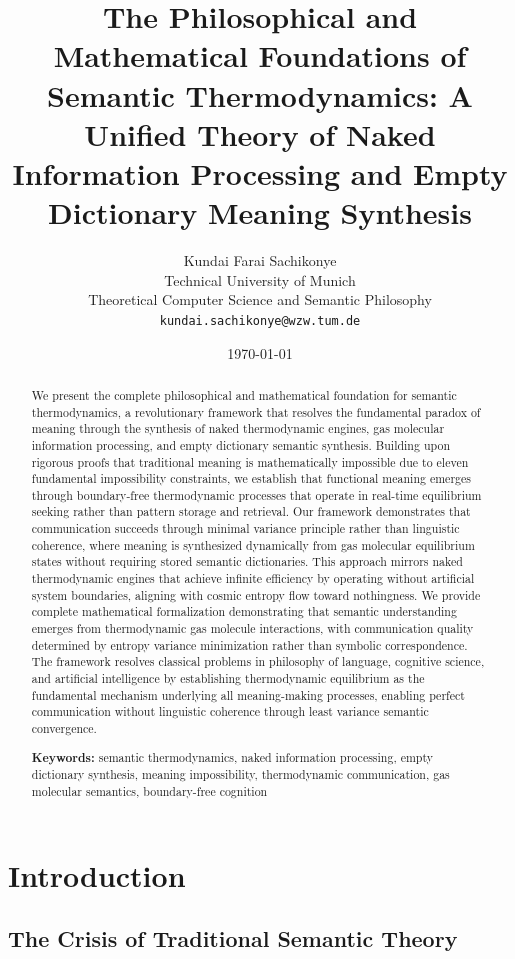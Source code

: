 \documentclass[11pt,a4paper]{article}
\title{The Philosophical and Mathematical Foundations of Semantic Thermodynamics: A Unified Theory of Naked Information Processing and Empty Dictionary Meaning Synthesis}
\author{Kundai Farai Sachikonye\\
Technical University of Munich\\
Theoretical Computer Science and Semantic Philosophy\\
\texttt{kundai.sachikonye@wzw.tum.de}}
\date{\today}
\begin{document}
\maketitle

\begin{abstract}
We present the complete philosophical and mathematical foundation for semantic thermodynamics, a revolutionary framework that resolves the fundamental paradox of meaning through the synthesis of naked thermodynamic engines, gas molecular information processing, and empty dictionary semantic synthesis. Building upon rigorous proofs that traditional meaning is mathematically impossible due to eleven fundamental impossibility constraints, we establish that functional meaning emerges through boundary-free thermodynamic processes that operate in real-time equilibrium seeking rather than pattern storage and retrieval. Our framework demonstrates that communication succeeds through minimal variance principle rather than linguistic coherence, where meaning is synthesized dynamically from gas molecular equilibrium states without requiring stored semantic dictionaries. This approach mirrors naked thermodynamic engines that achieve infinite efficiency by operating without artificial system boundaries, aligning with cosmic entropy flow toward nothingness. We provide complete mathematical formalization demonstrating that semantic understanding emerges from thermodynamic gas molecule interactions, with communication quality determined by entropy variance minimization rather than symbolic correspondence. The framework resolves classical problems in philosophy of language, cognitive science, and artificial intelligence by establishing thermodynamic equilibrium as the fundamental mechanism underlying all meaning-making processes, enabling perfect communication without linguistic coherence through least variance semantic convergence.

\textbf{Keywords:} semantic thermodynamics, naked information processing, empty dictionary synthesis, meaning impossibility, thermodynamic communication, gas molecular semantics, boundary-free cognition
\end{abstract}

\section{Introduction}

\subsection{The Crisis of Traditional Semantic Theory}
\end{document}
